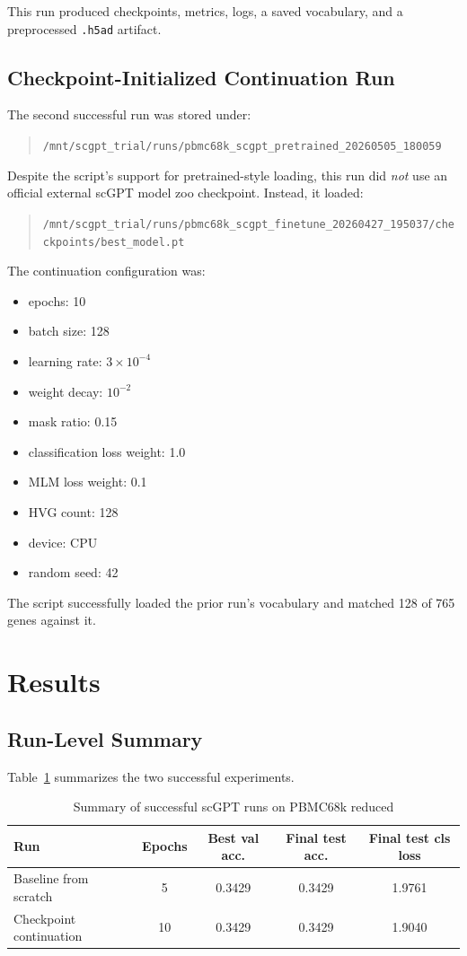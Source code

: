 \documentclass[11pt]{article}
\begin{document}
This run produced checkpoints, metrics, logs, a saved vocabulary, and a preprocessed \texttt{.h5ad} artifact.

\subsection{Checkpoint-Initialized Continuation Run}
The second successful run was stored under:
\begin{quote}
\texttt{/mnt/scgpt\_trial/runs/pbmc68k\_scgpt\_pretrained\_20260505\_180059}
\end{quote}

Despite the script's support for pretrained-style loading, this run did \emph{not} use an official external scGPT model zoo checkpoint. Instead, it loaded:
\begin{quote}
\texttt{/mnt/scgpt\_trial/runs/pbmc68k\_scgpt\_finetune\_20260427\_195037/checkpoints/best\_model.pt}
\end{quote}

The continuation configuration was:
\begin{itemize}
    \item epochs: 10
    \item batch size: 128
    \item learning rate: $3\times 10^{-4}$
    \item weight decay: $10^{-2}$
    \item mask ratio: 0.15
    \item classification loss weight: 1.0
    \item MLM loss weight: 0.1
    \item HVG count: 128
    \item device: CPU
    \item random seed: 42
\end{itemize}

The script successfully loaded the prior run's vocabulary and matched 128 of 765 genes against it.

\section{Results}
\subsection{Run-Level Summary}
Table~\ref{tab:summary} summarizes the two successful experiments.

\begin{table}[H]
\centering
\caption{Summary of successful scGPT runs on PBMC68k reduced}
\label{tab:summary}
\begin{tabular}{p{3.8cm}cccc}
\toprule
Run & Epochs & Best val acc. & Final test acc. & Final test cls loss \\
\midrule
Baseline from scratch & 5 & 0.3429 & 0.3429 & 1.9761 \\
Checkpoint continuation & 10 & 0.3429 & 0.3429 & 1.9040 \\
\bottomrule
\end{tabular}
\end{table}
\end{document}
